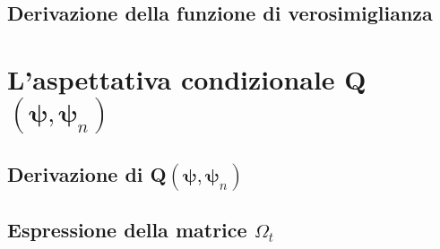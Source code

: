 \subsection[Derivazione della funzione di verosimiglianza]{Derivazione della funzione di verosimiglianza}

\section[L'aspettativa condizionale Q$(\boldsymbol{\psi}, \boldsymbol{\psi}_n)$]{L'aspettativa condizionale Q$(\boldsymbol{\psi}, \boldsymbol{\psi}_n)$}

\subsection[Derivazione di Q$(\boldsymbol{\psi}, \boldsymbol{\psi}_n)$]{Derivazione di Q$(\boldsymbol{\psi}, \boldsymbol{\psi}_n)$}

\subsection[Espressione della matrice $\Omega_t$]{Espressione della matrice $\Omega_t$}
